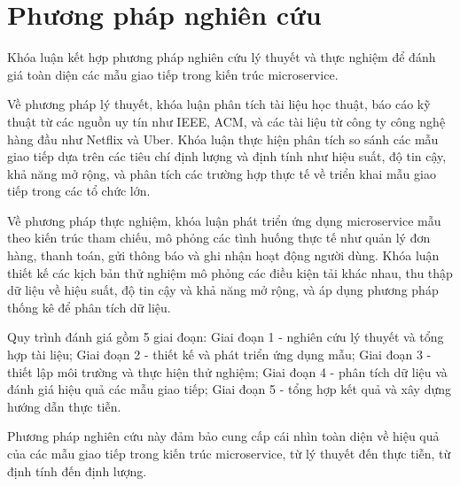 \section{Phương pháp nghiên cứu}
Khóa luận kết hợp phương pháp nghiên cứu lý thuyết và thực nghiệm để đánh giá toàn diện các mẫu giao tiếp trong kiến trúc microservice.

Về phương pháp lý thuyết, khóa luận phân tích tài liệu học thuật, báo cáo kỹ thuật từ các nguồn uy tín như IEEE, ACM, và các tài liệu từ công ty công nghệ hàng đầu như Netflix và Uber. Khóa luận thực hiện phân tích so sánh các mẫu giao tiếp dựa trên các tiêu chí định lượng và định tính như hiệu suất, độ tin cậy, khả năng mở rộng, và phân tích các trường hợp thực tế về triển khai mẫu giao tiếp trong các tổ chức lớn.

Về phương pháp thực nghiệm, khóa luận phát triển ứng dụng microservice mẫu theo kiến trúc tham chiếu, mô phỏng các tình huống thực tế như quản lý đơn hàng, thanh toán, gửi thông báo và ghi nhận hoạt động người dùng. Khóa luận thiết kế các kịch bản thử nghiệm mô phỏng các điều kiện tải khác nhau, thu thập dữ liệu về hiệu suất, độ tin cậy và khả năng mở rộng, và áp dụng phương pháp thống kê để phân tích dữ liệu.

Quy trình đánh giá gồm 5 giai đoạn: Giai đoạn 1 - nghiên cứu lý thuyết và tổng hợp tài liệu; Giai đoạn 2 - thiết kế và phát triển ứng dụng mẫu; Giai đoạn 3 - thiết lập môi trường và thực hiện thử nghiệm; Giai đoạn 4 - phân tích dữ liệu và đánh giá hiệu quả các mẫu giao tiếp; Giai đoạn 5 - tổng hợp kết quả và xây dựng hướng dẫn thực tiễn.

Phương pháp nghiên cứu này đảm bảo cung cấp cái nhìn toàn diện về hiệu quả của các mẫu giao tiếp trong kiến trúc microservice, từ lý thuyết đến thực tiễn, từ định tính đến định lượng.